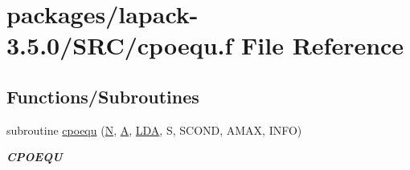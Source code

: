 \hypertarget{cpoequ_8f}{}\section{packages/lapack-\/3.5.0/\+S\+R\+C/cpoequ.f File Reference}
\label{cpoequ_8f}
\subsection*{Functions/\+Subroutines}
\begin{DoxyCompactItemize}
\item 
subroutine \hyperlink{group__complexPOcomputational_ga175bba20a3b3ca013531900779876573}{cpoequ} (\hyperlink{polmisc_8c_a0240ac851181b84ac374872dc5434ee4}{N}, \hyperlink{classA}{A}, \hyperlink{example__user_8c_ae946da542ce0db94dced19b2ecefd1aa}{L\+D\+A}, S, S\+C\+O\+N\+D, A\+M\+A\+X, I\+N\+F\+O)
\begin{DoxyCompactList}\small\item\em {\bfseries C\+P\+O\+E\+Q\+U} \end{DoxyCompactList}\end{DoxyCompactItemize}
